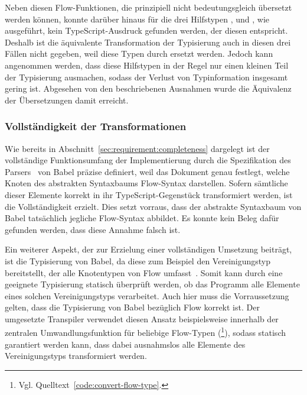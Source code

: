 Neben diesen Flow-Funktionen, die prinzipiell nicht bedeutungsgleich übersetzt werden können, konnte darüber hinaus für die drei Hilfstypen ,  und , wie ausgeführt, kein TypeScript-Ausdruck gefunden werden, der diesen entspricht. Deshalb ist die äquivalente Transformation der Typisierung auch in diesen drei Fällen nicht gegeben, weil diese Typen durch  ersetzt werden. Jedoch kann angenommen werden, dass diese Hilfstypen in der Regel nur einen kleinen Teil der Typisierung ausmachen, sodass der Verlust von Typinformation insgesamt gering ist. Abgesehen von den beschriebenen Ausnahmen wurde die Äquivalenz der Übersetzungen damit erreicht.

\subsubsection{Vollständigkeit der Transformationen}

Wie bereits in Abschnitt~\ref{sec:requirement:completeness} dargelegt ist der vollständige Funktionsumfang der Implementierung durch die Spezifikation des Parsers~\autocite{BABEL:PARSER_SPEC} von Babel präzise definiert, weil das Dokument genau festlegt, welche Knoten des abstrakten Syntaxbaums Flow-Syntax darstellen. Sofern sämtliche dieser Elemente korrekt in ihr TypeScript-Gegenstück transformiert werden, ist die Vollständigkeit erzielt. Dies setzt vorraus, dass der abstrakte Syntaxbaum von Babel tatsächlich jegliche Flow-Syntax abbildet. Es konnte kein Beleg dafür gefunden werden, dass diese Annahme falsch ist.

Ein weiterer Aspekt, der zur Erzielung einer vollständigen Umsetzung beiträgt, ist die Typisierung von Babel, da diese zum Beispiel den Vereinigungstyp  bereitstellt, der alle Knotentypen von Flow umfasst~\autocite{BABEL:TYPES}. Somit kann durch eine geeignete Typisierung statisch überprüft werden, ob das Programm alle Elemente eines solchen Vereinigungstyps verarbeitet. Auch hier muss die Vorraussetzung gelten, dass die Typisierung von Babel bezüglich Flow korrekt ist.
Der umgesetzte Transpiler verwendet diesen Ansatz beispielsweise innerhalb der zentralen Umwandlungsfunktion für beliebige Flow-Typen (\footnote{Vgl. Quelltext~\ref{code:convert-flow-type}.}), sodass statisch garantiert werden kann, dass dabei ausnahmslos alle Elemente des Vereinigungstyps  transformiert werden.

